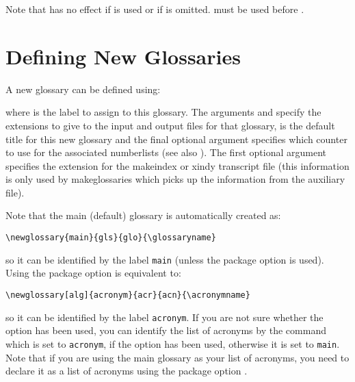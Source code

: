 \documentclass[report]{nlctdoc}
\begin{document}
\begin{important}\raggedright
Note that  has no effect if 
 is used or if  is omitted.
 must be used before 
.\par
\end{important}


\chapter{Defining New Glossaries}
\label{sec:newglossary}

A new glossary can be defined using:
\begin{definition}[\DescribeMacro{\newglossary}]
\linebreak{}
\end{definition}
where  is the label to assign to this glossary. The
arguments  and  specify the extensions to
give to the input and output files for that glossary, 
is the default title for this new glossary and the final optional
argument  specifies which counter to use for the
associated \glspl{numberlist} (see also
). The first optional argument specifies
the extension for the \gls{makeindex} or \gls{xindy} transcript file
(this information is only used by \gls{makeglossaries} which picks
up the information from the auxiliary file).

Note that the main (default) glossary is automatically created as:
\begin{verbatim}
\newglossary{main}{gls}{glo}{\glossaryname}
\end{verbatim}
so it can be identified by the label \texttt{main} (unless the
 package option is used). Using the
 package option is equivalent to:
\begin{verbatim}
\newglossary[alg]{acronym}{acr}{acn}{\acronymname}
\end{verbatim}
so it can be identified by the label \texttt{acronym}. If you are
not sure whether the  option has been used, you
can identify the list of acronyms by the command 
\DescribeMacro{\acronymtype} which is set to
\texttt{acronym}, if the  option has been used,
otherwise it is set to \texttt{main}. Note that if you are using
the main glossary as your list of acronyms, you need to declare
it as a list of acronyms using the package option 
.
\end{document}
